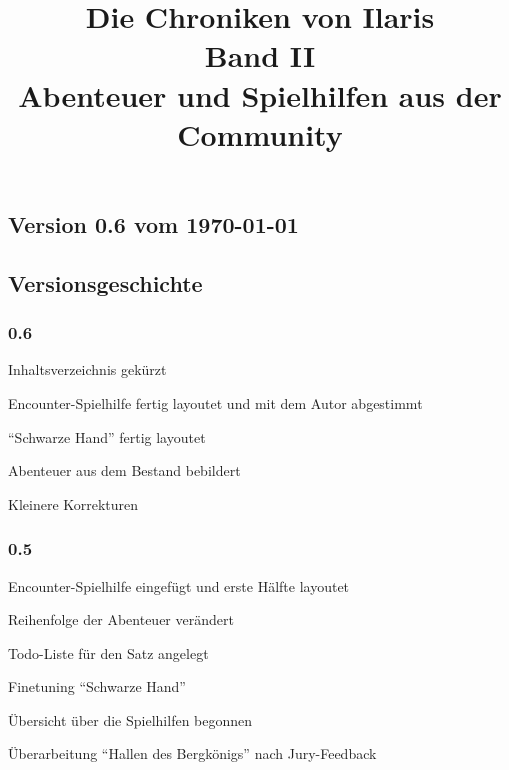 \documentclass[openright]{Ilaris}
\title{Die Chroniken von Ilaris\\ Band II\\ Abenteuer und Spielhilfen aus der Community}
\begin{document}
\hauptteil
\titelseite{%
	\begin{centering}
		\titelbild{cover.jpg}
		\mbox{}
		\vspace{10cm}
		
		
	\end{centering}
}
\neueseite
\subsection*{Version 0.6 vom \today}
\subsection*{Versionsgeschichte}
\subsubsection*{0.6}
Inhaltsverzeichnis gekürzt

Encounter-Spielhilfe fertig layoutet und mit dem Autor abgestimmt

\enquote{Schwarze Hand} fertig layoutet

Abenteuer aus dem Bestand bebildert

Kleinere Korrekturen

\subsubsection*{0.5}
Encounter-Spielhilfe eingefügt und erste Hälfte layoutet

Reihenfolge der Abenteuer verändert

Todo-Liste für den Satz angelegt

Finetuning \enquote{Schwarze Hand}

Übersicht über die Spielhilfen begonnen

Überarbeitung \enquote{Hallen des Bergkönigs} nach Jury-Feedback
\end{document}

